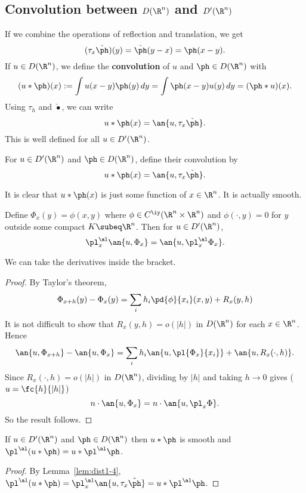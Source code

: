 
\subsection{Convolution between $D(\R^n)$ and $D'(\R^n)$}
If we combine the operations of reflection and translation, we get 
\[
(\tau_x\check{\ph})(y)=\check{\ph} (y-x)=\ph(x-y).
\]
If $u\in D(\R^n)$, we define the \textbf{convolution} of $u$ and $\ph\in D(\R^n)$ with
\[
(u*\ph)(x):=\int u(x-y)\ph(y)\,dy=\int \ph(x-y)u(y)\,dy=(\ph*u)(x).
\]
Using $\tau_h$ and $\check{\bullet}$, we can write 
\[
u*\ph(x)=\an{u,\tau_x \check{\ph}}.
\]
This is well defined for all $u\in D'(\R^n)$.
\begin{df}
For $u\in D'(\R^n)$ and $\ph\in D(\R^n)$, define their convolution by 
\[u*\ph(x)=\an{u,\tau_x\check{\ph}}.\]
\end{df}
It is clear that $u*\ph(x)$ is just some function of $x\in \R^n$. It is actually smooth.
\begin{lem}
Define $\Phi_x(y)=\phi(x,y)$ where $\phi\in C^{\iy}(\R^n\times \R^n)$ and $\phi(\cdot, y)=0$ for $y$ outside some compact $K\subeq \R^n$. Then for $u\in D'(\R^n)$, 
\[
\pl_x^{\al} \an{u,\Phi_x}=\an{u, \pl^{\al}_x \Phi_x}.
\]
\end{lem}
We can take the derivatives inside the bracket.
\begin{proof}
By Taylor's theorem,  
\[
\Phi_{x+h}(y)-\Phi_x(y)=\sum_i h_i \pd{\phi}{x_i} (x,y)+R_x(y,h)
\]
It is not difficult to show that $R_x(y,h)=o(|h|)$ in $D(\R^n)$ for each $x\in \R^n$. Hence
\[
\an{u,\Phi_{x+h}}-\an{u,\Phi_x}=\sum_i h_i \an{u,\pl{\Phi_x}{x_i}}+\an{u,R_x(\cdot, h)}.
\]
Since $R_x(\cdot, h)=o(|h|)$ in $D(\R^n)$, dividing by $|h|$ and taking $h\to 0$ gives ($u=\fc{h}{|h|}$)
\[
n\cdot \an{u, \Phi_x}=n\cdot \an{u,\pl_x\Phi}.
\]
So the result follows.
\end{proof}
\begin{cor}
If $u\in D'(\R^n)$ and $\ph\in D(\R^n)$ then $u*\ph$ is smooth and $\pl^{\al}(u*\ph)=u*\pl^{\al}\ph$. 
\end{cor}
\begin{proof}
By Lemma~\ref{lem:dist1-4}, $\pl^{\al}(u*\ph)=\pl^{\al}_x\an{u,\tau_x \check{\ph}}=u*\pl^{\al}\ph$.
\end{proof}
